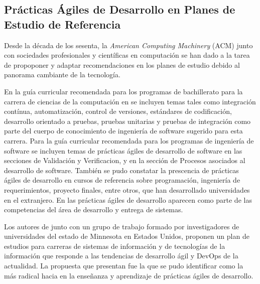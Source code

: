 \documentclass[journal]{IEEEtran}
\begin{document}
\subsection{Prácticas Ágiles de Desarrollo en Planes de Estudio de Referencia}
Desde la década de los sesenta, la \emph{American Computing Machinery} (ACM) junto con sociedades profesionales y científicas en computación se han dado a la tarea de propoponer y adaptar  recomendaciones en los planes de estudio debido al panorama cambiante de la tecnología\cite{acm-curriculum}.

En la guía curricular recomendada para los programas de bachillerato para la carrera de ciencias de la computación en \cite{acm-cs-curriculum} se incluyen temas tales como integración contínua, automatización, control de versiones, estándares de codificación, desarrollo orientado a pruebas, pruebas unitarias y pruebas de integración como parte del cuerpo de conocimiento de ingeniería de software sugerido para esta carrera. Para la guía curricular recomendada para los programas de ingeniería de software \cite{acm-se-curriculum} se incluyen temas de prácticas ágiles de desarrollo de software en las secciones de Validación y Verificacion, y en la sección de Procesos asociados al desarrollo de software. También se pudo constatar la prescencia de prácticas ágiles de desarrollo en cursos de referencia sobre  programación, ingeniería de requerimientos, proyecto finales, entre otros, que han desarrollado universidades en el extranjero. En \cite{acm-msis-curriculum} las prácticas ágiles de desarrollo aparecen como parte de las competencias del área de desarrollo y entrega de sistemas. 

Los autores de \cite{betz-et-al} junto con un grupo de trabajo formado por investigadores de universidades del estado de Minnesota en Estados Unidos, proponen un plan de estudios para carreras de sistemas de información y de tecnologías de la información que responde a las tendencias de desarrollo ágil y DevOps \cite{advance-it} de la actualidad. La propuesta que presentan fue la que se pudo identificar como la más radical hacia en la enseñanza y aprendizaje de prácticas ágiles de desarrollo.
\end{document}
